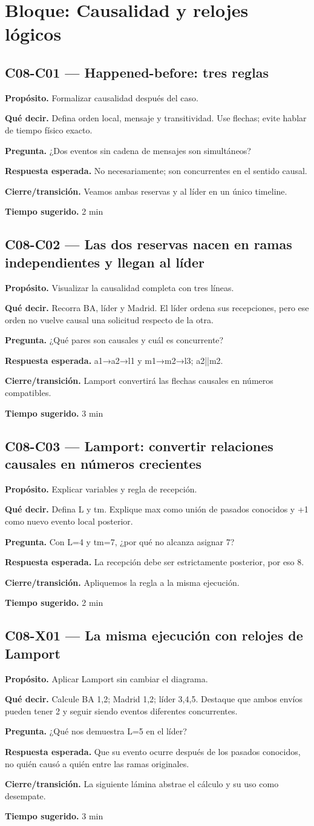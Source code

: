 \documentclass[variant=docente,cover=institutional,mode=screen]{ua-engineering-v6-article}
\newcommand{\FrameField}[2]{\par\noindent\textbf{#1.} #2\par}
\begin{document}
\section{Bloque: Causalidad y relojes lógicos}

\subsection*{C08-C01 --- Happened-before: tres reglas}
\FrameField{Propósito}{Formalizar causalidad después del caso.}
\FrameField{Qué decir}{Defina orden local, mensaje y transitividad. Use flechas; evite hablar de tiempo físico exacto.}
\FrameField{Pregunta}{¿Dos eventos sin cadena de mensajes son simultáneos?}
\FrameField{Respuesta esperada}{No necesariamente; son concurrentes en el sentido causal.}
\FrameField{Cierre/transición}{Veamos ambas reservas y al líder en un único timeline.}
\FrameField{Tiempo sugerido}{2 min}

\subsection*{C08-C02 --- Las dos reservas nacen en ramas independientes y llegan al líder}
\FrameField{Propósito}{Visualizar la causalidad completa con tres líneas.}
\FrameField{Qué decir}{Recorra BA, líder y Madrid. El líder ordena sus recepciones, pero ese orden no vuelve causal una solicitud respecto de la otra.}
\FrameField{Pregunta}{¿Qué pares son causales y cuál es concurrente?}
\FrameField{Respuesta esperada}{a1→a2→l1 y m1→m2→l3; a2||m2.}
\FrameField{Cierre/transición}{Lamport convertirá las flechas causales en números compatibles.}
\FrameField{Tiempo sugerido}{3 min}

\subsection*{C08-C03 --- Lamport: convertir relaciones causales en números crecientes}
\FrameField{Propósito}{Explicar variables y regla de recepción.}
\FrameField{Qué decir}{Defina L y tm. Explique max como unión de pasados conocidos y +1 como nuevo evento local posterior.}
\FrameField{Pregunta}{Con L=4 y tm=7, ¿por qué no alcanza asignar 7?}
\FrameField{Respuesta esperada}{La recepción debe ser estrictamente posterior, por eso 8.}
\FrameField{Cierre/transición}{Apliquemos la regla a la misma ejecución.}
\FrameField{Tiempo sugerido}{2 min}

\subsection*{C08-X01 --- La misma ejecución con relojes de Lamport}
\FrameField{Propósito}{Aplicar Lamport sin cambiar el diagrama.}
\FrameField{Qué decir}{Calcule BA 1,2; Madrid 1,2; líder 3,4,5. Destaque que ambos envíos pueden tener 2 y seguir siendo eventos diferentes concurrentes.}
\FrameField{Pregunta}{¿Qué nos demuestra L=5 en el líder?}
\FrameField{Respuesta esperada}{Que su evento ocurre después de los pasados conocidos, no quién causó a quién entre las ramas originales.}
\FrameField{Cierre/transición}{La siguiente lámina abstrae el cálculo y su uso como desempate.}
\FrameField{Tiempo sugerido}{3 min}
\end{document}
